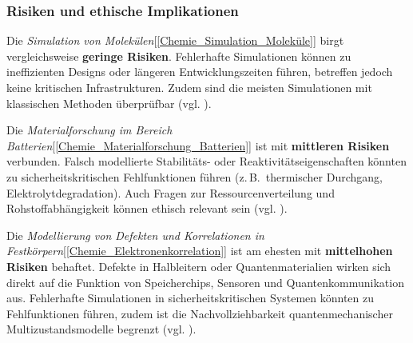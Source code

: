 \subsubsection{Risiken und ethische Implikationen}

Die \textit{Simulation von Molekülen}[\ref{Chemie_Simulation_Moleküle}] birgt vergleichsweise \textbf{geringe Risiken}. Fehlerhafte Simulationen können zu ineffizienten Designs oder längeren Entwicklungszeiten führen, betreffen jedoch keine kritischen Infrastrukturen. Zudem sind die meisten Simulationen mit klassischen Methoden überprüfbar (vgl. \cite{mcardle_quantum_2020}).

\vspace{0.5em}

Die \textit{Materialforschung im Bereich Batterien}[\ref{Chemie_Materialforschung_Batterien}] ist mit \textbf{mittleren Risiken} verbunden. Falsch modellierte Stabilitäts- oder Reaktivitätseigenschaften könnten zu sicherheitskritischen Fehlfunktionen führen (z.\,B.\ thermischer Durchgang, Elektrolytdegradation). Auch Fragen zur Ressourcenverteilung und Rohstoffabhängigkeit können ethisch relevant sein (vgl. \cite{demirApplicationQuantumComputing2024}).

\vspace{0.5em}

Die \textit{Modellierung von Defekten und Korrelationen in Festkörpern}[\ref{Chemie_Elektronenkorrelation}] ist am ehesten mit \textbf{mittelhohen Risiken} behaftet. Defekte in Halbleitern oder Quantenmaterialien wirken sich direkt auf die Funktion von Speicherchips, Sensoren und Quantenkommunikation aus. Fehlerhafte Simulationen in sicherheitskritischen Systemen könnten zu Fehlfunktionen führen, zudem ist die Nachvollziehbarkeit quantenmechanischer Multizustandsmodelle begrenzt (vgl. \cite{orus_quantum_2019,freysoldt_first-principles_2014}).

